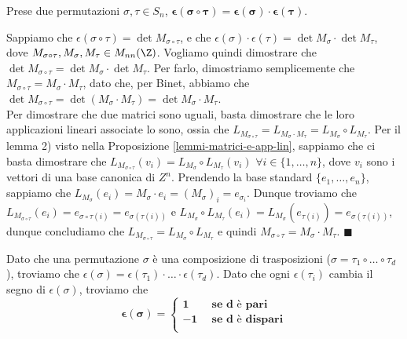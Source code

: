 \documentclass[11pt, a4paper, titlepage, oneside]{scrbook}
\begin{document}
\begin{Osservazione}[]
\label{oss-matrice-permutazione-3}
Prese due permutazioni $\sigma, \tau \in S_n$, $\bm{\epsilon(\sigma \circ \tau) = \epsilon(\sigma) \cdot \epsilon(\tau)}$.
\end{Osservazione}

\Dimostrazione \nopagebreak

Sappiamo che $\epsilon(\sigma \circ \tau) = \det M_{\sigma \circ \tau}$, e che $\epsilon(\sigma) \cdot \epsilon(\tau) = \det M_\sigma \cdot \det M_\tau$, dove \mbox{$M_{\sigma \circ \tau}, M_\sigma, M_\tau \in M_{nn}(\Z)$}. Vogliamo quindi dimostrare che $\det M_{\sigma \circ \tau} = \det M_\sigma \cdot \det M_\tau$. Per farlo, dimostriamo semplicemente che $M_{\sigma \circ \tau} = M_\sigma \cdot M_\tau$, dato che, per Binet, abbiamo che \mbox{$\det M_{\sigma \circ \tau} = \det (M_\sigma \cdot M_\tau) = \det M_\sigma \cdot M_\tau$}. \\
Per dimostrare che due matrici sono uguali, basta dimostrare che le loro applicazioni lineari associate lo sono, ossia che $L_{M_{\sigma \circ \tau}} = L_{M_\sigma \cdot M_\tau} = L_{M_\sigma} \circ L_{M_\tau}$. Per il lemma 2) visto nella Proposizione \ref{lemmi-matrici-e-app-lin}, sappiamo che ci basta dimostrare che $L_{M_{\sigma \circ \tau}}(v_i) = L_{M_\sigma} \circ L_{M_\tau} (v_i)$ \mbox{$\forall i \in \{1, \ldots, n\}$}, dove $v_i$ sono i vettori di una base canonica di $Z^n$. Prendendo la base standard $\{e_1, \ldots, e_n\}$, sappiamo che $L_{M_\sigma}(e_i) = M_\sigma \cdot e_i = (M_\sigma)_i = e_{\sigma_i}$. Dunque troviamo che $L_{M_{\sigma \circ \tau}}(e_i) = e_{\sigma \circ \tau(i)} = e_{\sigma(\tau(i))}$ e $L_{M_\sigma} \circ L_{M_\tau}(e_i) = L_{M_\sigma}(e_{\tau(i)}) = e_{\sigma(\tau(i))}$, dunque concludiamo che $L_{M_{\sigma \circ \tau}} = L_{M_\sigma} \circ L_{M_\tau}$ e quindi $M_{\sigma \circ \tau} = M_\sigma \cdot M_\tau$. $\blacksquare$

\begin{Osservazione}[]
\label{oss-matrice-permutazione-4}
Dato che una permutazione $\sigma$ è una composizione di trasposizioni ($\sigma = \tau_1 \circ \ldots \circ \tau_d$), troviamo che $\epsilon(\sigma) = \epsilon (\tau_1) \cdot \ldots \cdot \epsilon(\tau_d)$. Dato che ogni $\epsilon(\tau_i)$ cambia il segno di $\epsilon(\sigma)$, troviamo che
\[
\bm{\epsilon(\sigma)} = 
\begin{cases}
\bm{1} & \enspace \textbf{se } \bm{d} \textbf{ è pari} \\
\bm{-1} & \enspace \textbf{se } \bm{d} \textbf{ è dispari} \\
\end{cases}
\]
\end{Osservazione}
\end{document}

